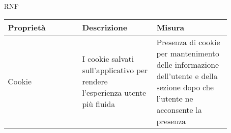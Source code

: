 \begin{listaPersonale}{RNF}
    \begin{tabular}{|p{0.3\linewidth}|p{0.3\linewidth}|p{0.3\linewidth}|}
        \hline
        \rowcolor{viola} \textbf{Proprietà} &
        \textbf{Descrizione}                &
        \textbf{Misura}                       \\
        \hline
        Cookie                              &
        I cookie salvati sull'applicativo
        per rendere l'esperienza utente
        più fluida                          &
        Presenza di cookie per mantenimento
        delle informazione dell'utente e
        della sezione dopo che l'utente
        ne acconsente la presenza             \\
        \hline
    \end{tabular}

\end{listaPersonale}